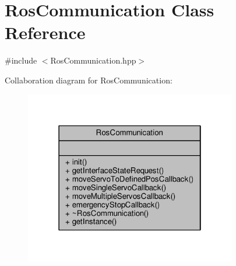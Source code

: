 \hypertarget{class_ros_communication}{}\section{Ros\+Communication Class Reference}
\label{class_ros_communication}


{\ttfamily \#include $<$Ros\+Communication.\+hpp$>$}



Collaboration diagram for Ros\+Communication\+:
\nopagebreak
\begin{figure}[H]
\begin{center}
\leavevmode
\includegraphics[width=262pt]{class_ros_communication__coll__graph}
\end{center}
\end{figure}

